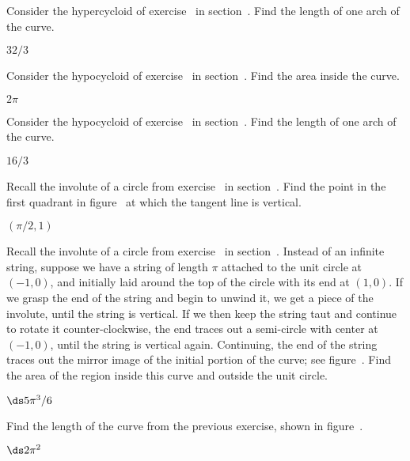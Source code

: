 \begin{exercises}
\exercise Consider the hypercycloid of
exercise~ in section~. Find the length of one arch of the curve.  
\begin{answer} $32/3$
\end{answer}

\exercise Consider the hypocycloid of 
exercise~ in 
section~. Find the area inside the curve.
\begin{answer} $2\pi$
\end{answer}

\exercise Consider the hypocycloid of
exercise~ in section~. Find the length of one arch of the curve.  
\begin{answer} $16/3$
\end{answer}

\exercise Recall the involute of a circle from
exercise~ in
section~. Find the point in the first
quadrant in figure~ 
at which the tangent line is vertical.
\begin{answer} $(\pi/2,1)$
\end{answer}

\exercise Recall the involute of a circle from
exercise~ in
section~. Instead of an infinite
string, suppose we have a string of length $\pi$ attached to the unit
circle at $(-1,0)$, and initially laid around the top of the circle
with its end at $(1,0)$. If we grasp the end of the string and begin
to unwind it, we get a piece of the involute, until the string is
vertical. If we then keep the string taut and continue to rotate it
counter-clockwise, the end traces out a semi-circle with center at
$(-1,0)$, until the string is vertical again. Continuing, the end of
the string traces out the mirror image of the initial portion of the
curve; see figure~. Find the area
of the region inside this curve and outside the unit circle.
\begin{answer} $\ds 5\pi^3/6$
\end{answer}

\exercise Find the length of the curve from the previous exercise,
shown in figure~.
\begin{answer} $\ds 2\pi^2$
\end{answer}


\end{exercises}
